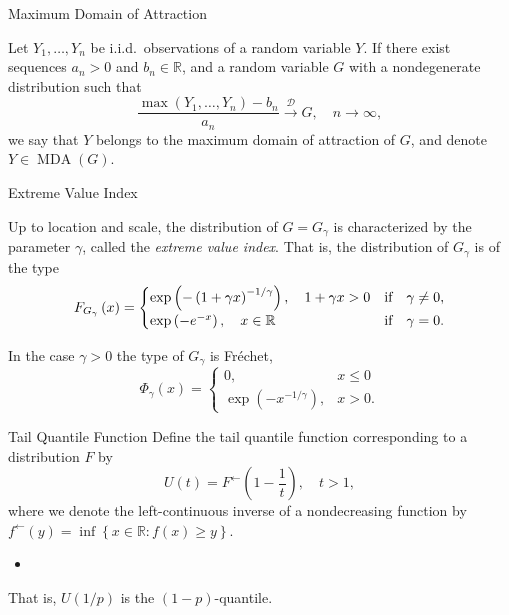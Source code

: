 \documentclass[11pt, aspectratio=169]{beamer}
\DeclareMathOperator{\mda}{MDA}
\begin{document}
\begin{frame}{Maximum Domain of Attraction}
  \begin{definition}
    Let $Y_1, \ldots, Y_n$ be i.i.d.\ observations of a random variable $Y$. If
    there exist sequences $a_n > 0$ and $b_n\in\mathbb{R}$, and a random
    variable $G$ with a nondegenerate distribution such that
    \begin{equation*}
	    \frac{\max\left(Y_1, \ldots, Y_n\right) - b_n}{a_n}
      \stackrel{\mathcal{D}}{\to} G, \quad n\to\infty,
    \end{equation*}
    we say that $Y$ belongs to the maximum domain of attraction of $G$, and
    denote $Y\in\mda\left(G\right)$.
  \end{definition}
\end{frame}


\begin{frame}{Extreme Value Index}
  \begin{theorem}
    Up to location and scale, the distribution of $G = G_\gamma$ is
    characterized by the parameter $\gamma$, called the \emph{extreme value
    index}. That is, the distribution of ${G_\gamma}$ is of the type
    \begin{equation*}
      F_{G_\gamma}\left(x\right) =
      \begin{cases}
        \exp\left(-\left(1 + \gamma x\right)^{-1/\gamma}\right),
        \quad 1 + \gamma x > 0 &\textnormal{if}\quad \gamma\neq 0, \\
        \exp\left(-e^{-x}\right),
        \quad x\in\mathbb{R} &\textnormal{if}\quad \gamma = 0.
      \end{cases}
    \end{equation*}
  \end{theorem}
  \pause
  In the case $\gamma > 0$ the type of $G_\gamma$ is Fr\'echet,
  \begin{equation*}
    \Phi_\gamma\left(x\right) =
    \begin{cases}
      0, & x\leq 0 \\
      \exp\left(-x^{-1/\gamma}\right), & x > 0.
    \end{cases}
  \end{equation*}
\end{frame}


\begin{frame}{Tail Quantile Function}
  Define the tail quantile function corresponding to a distribution $F$ by
  \begin{equation*}
    U\left(t\right) = F^{\leftarrow}\left(1 - \frac{1}{t}\right), \quad t > 1,
  \end{equation*}
  where we denote the left-continuous inverse of a nondecreasing function by
  $f^\leftarrow\left(y\right) = \inf\left\{x\in\mathbb{R} : f(x) \geq
  y\right\}$.
  \pause
  \begin{itemize}
    \item[] 
  \end{itemize}
  That is, $U\left(1/p\right)$ is the $(1-p)$-quantile.
\end{frame}
\end{document}
